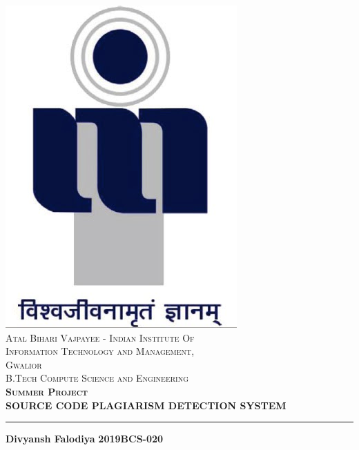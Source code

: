 \documentclass[12pt]{article}
\begin{document}

\begin{titlepage}
	\centering
    \includegraphics[scale = 0.35]{iiitm.jpg}\\[1.0 cm]	%
    \textsc{\large Atal Bihari Vajpayee - Indian Institute Of } \\[0.5cm]
    \textsc{\large Information Technology and Management,} \\[0.5cm]
    \textsc{\large Gwalior}\\[2.0 cm]
    \textsc{\large B.Tech Compute Science and Engineering}\\[0.8 cm]

	\textsc{\Large \textbf{Summer Project} }\\[0.5 cm]				%
	\textsc{\large \textbf{SOURCE CODE PLAGIARISM DETECTION SYSTEM} }\\[1.5 cm]
	\rule[0pt]{\linewidth}{1pt}
	
    \begin{flushright}
    	\textbf{\large   Divyansh Falodiya}\linebreak
		\textbf{\large  2019BCS-020}\linebreak
	\end{flushright}
			

\end{titlepage}
\end{document}
